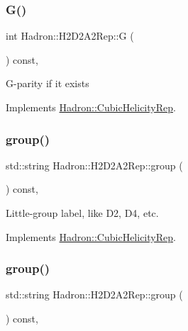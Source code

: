 \subsubsection{\texorpdfstring{G()}{G()}\hspace{0.1cm}{\footnotesize\ttfamily [3/3]}}
{\footnotesize\ttfamily int Hadron\+::\+H2\+D2\+A2\+Rep\+::G (\begin{DoxyParamCaption}{ }\end{DoxyParamCaption}) const\hspace{0.3cm}{\ttfamily [inline]}, {\ttfamily [virtual]}}

G-\/parity if it exists 

Implements \mbox{\hyperlink{structHadron_1_1CubicHelicityRep_a50689f42be1e6170aa8cf6ad0597018b}{Hadron\+::\+Cubic\+Helicity\+Rep}}.

\mbox{\label{structHadron_1_1H2D2A2Rep_a03d366c9b575134ad5bfdba3884b4181}} 
\subsubsection{\texorpdfstring{group()}{group()}\hspace{0.1cm}{\footnotesize\ttfamily [1/5]}}
{\footnotesize\ttfamily std\+::string Hadron\+::\+H2\+D2\+A2\+Rep\+::group (\begin{DoxyParamCaption}{ }\end{DoxyParamCaption}) const\hspace{0.3cm}{\ttfamily [inline]}, {\ttfamily [virtual]}}

Little-\/group label, like D2, D4, etc. 

Implements \mbox{\hyperlink{structHadron_1_1CubicHelicityRep_a101a7d76cd8ccdad0f272db44b766113}{Hadron\+::\+Cubic\+Helicity\+Rep}}.

\mbox{\label{structHadron_1_1H2D2A2Rep_a03d366c9b575134ad5bfdba3884b4181}} 
\subsubsection{\texorpdfstring{group()}{group()}\hspace{0.1cm}{\footnotesize\ttfamily [2/5]}}
{\footnotesize\ttfamily std\+::string Hadron\+::\+H2\+D2\+A2\+Rep\+::group (\begin{DoxyParamCaption}{ }\end{DoxyParamCaption}) const\hspace{0.3cm}{\ttfamily [inline]}, {\ttfamily [virtual]}}

